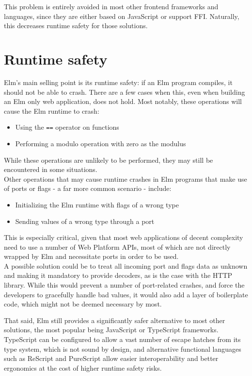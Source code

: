 This problem is entirely avoided in most other frontend frameworks and languages, since they are either based on JavaScript or support FFI. Naturally, this decreases runtime safety for those solutions.

\section{Runtime safety}
Elm's main selling point is its runtime safety: if an Elm program compiles, it should not be able to crash. There are a few cases when this, even when building an Elm only web application, does not hold. Most notably, these operations will cause the Elm runtime to crash:
\begin{itemize}
    \item Using the \texttt{==} operator on functions \cite{noauthor_corehints5md_nodate}
    \item Performing a modulo operation with zero as the modulus \cite{noauthor_corehints11md_nodate}
\end{itemize}
While these operations are unlikely to be performed, they may still be encountered in some situations.\\

Other operations that may cause runtime crashes in Elm programs that make use of ports or flags - a far more common scenario - include:
\begin{itemize}
    \item Initializing the Elm runtime with flags of a wrong type \cite{noauthor_corehints2md_nodate}
    \item Sending values of a wrong type through a port \cite{noauthor_corehints4md_nodate}
\end{itemize}
This is especially critical, given that most web applications of decent complexity need to use a number of Web Platform APIs, most of which are not directly wrapped by Elm and necessitate ports in order to be used.\\
A possible solution could be to treat all incoming port and flags data as unknown and making it mandatory to provide decoders, as is the case with the HTTP library. While this would prevent a number of port-related crashes, and force the developers to gracefully handle bad values, it would also add a layer of boilerplate code, which might not be deemed necessary by most.

That said, Elm still provides a significantly safer alternative to most other solutions, the most popular being JavaScript or TypeScript frameworks. TypeScript can be configured to allow a vast number of escape hatches from its type system, which is not sound by design, and alternative functional languages such as ReScript and PureScript allow easier interoperability and better ergonomics at the cost of higher runtime safety risks.

